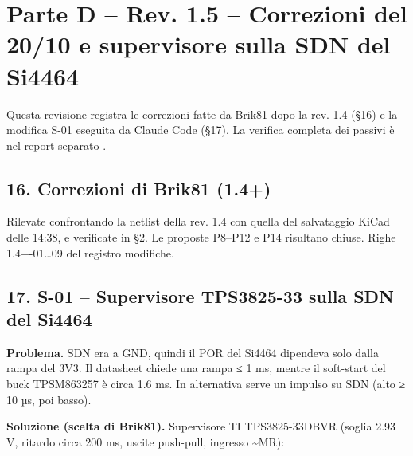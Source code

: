 \clearpage
\section[Parte D – Rev. 1.5 – Correzioni del 20/\allowbreak{}10 e supervisore sulla SDN del Si4464]{Parte D – Rev. 1.5 – Correzioni del 20/\allowbreak{}10 e supervisore sulla SDN del Si4464}

Questa revisione registra le correzioni fatte da Brik81 dopo la rev. 1.4 (§16) e la modifica S-01 eseguita da Claude Code (§17). La verifica completa dei passivi è nel report separato .

\subsection[16. Correzioni di Brik81 (1.4+)]{16. Correzioni di Brik81 (1.4+) }

Rilevate confrontando la netlist della rev. 1.4 con quella del salvataggio KiCad delle 14:38, e verificate in  §2. Le proposte P8–P12 e P14 risultano chiuse. Righe 1.4+-01…09 del registro modifiche.

\subsection[17. S-01 – Supervisore TPS3825-33 sulla SDN del Si4464]{17. S-01 – Supervisore TPS3825-33 sulla SDN del Si4464 }

\textbf{Problema.} SDN era a GND, quindi il POR del Si4464 dipendeva solo dalla rampa del 3V3. Il datasheet chiede una rampa ≤ 1 ms, mentre il soft-start del buck TPSM863257 è circa 1.6 ms. In alternativa serve un impulso su SDN (alto ≥ 10 µs, poi basso).

\textbf{Soluzione (scelta di Brik81).} Supervisore TI TPS3825-33DBVR (soglia 2.93 V, ritardo circa 200 ms, uscite push-pull, ingresso \textasciitilde{}MR):

